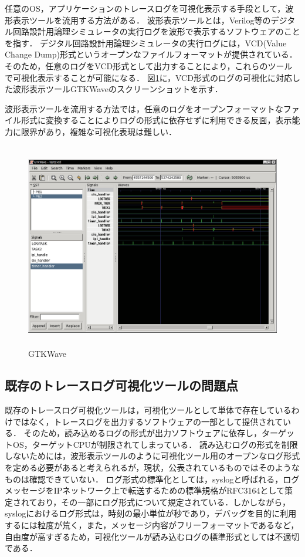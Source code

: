 任意のOS，アプリケーションのトレースログを可視化表示する手段として，波形表示ツールを流用する方法がある．
波形表示ツールとは，Verilog等のデジタル回路設計用論理シミュレータの実行ログを波形で表示するソフトウェアのことを指す．
デジタル回路設計用論理シミュレータの実行ログには，VCD(Value Change Dump)形式というオープンなファイルフォーマットが提供されている．
そのため，任意のログをVCD形式として出力することにより，これらのツールで可視化表示することが可能になる．
図\ref{fig:GTKWave}に，VCD形式のログの可視化に対応した波形表示ツールGTKWaveのスクリーンショットを示す．

波形表示ツールを流用する方法では，任意のログをオープンフォーマットなファイル形式に変換することによりログの形式に依存せずに利用できる反面，表示能力に限界があり，複雑な可視化表現は難しい．

\begin{figure}[p]
\begin{center}
\includegraphics[height=9cm]{img/GTKWave.eps}
\caption{GTKWave}
\label{fig:GTKWave}
\end{center}
\end{figure}

\subsection{既存のトレースログ可視化ツールの問題点}

既存のトレースログ可視化ツールは，可視化ツールとして単体で存在しているわけではなく，トレースログを出力するソフトウェアの一部として提供されている．
そのため，読み込めるログの形式が出力ソフトウェアに依存し，ターゲットOS，ターゲットCPUが制限されてしまっている．
読み込むログの形式を制限しないためには，波形表示ツールのように可視化ツール用のオープンなログ形式を定める必要があると考えられるが，現状，公表されているものではそのようなものは確認できていない．
ログ形式の標準化としては，syslog\cite{RFC3164}と呼ばれる，ログメッセージをIPネットワーク上で転送するための標準規格がRFC3164として策定されており，その一部にログ形式について規定されている．しかしながら，syslogにおけるログ形式は，時刻の最小単位が秒であり，デバッグを目的に利用するには粒度が荒く，また，メッセージ内容がフリーフォーマットであるなど，自由度が高すぎるため，可視化ツールが読み込むログの標準形式としては不適切である．

